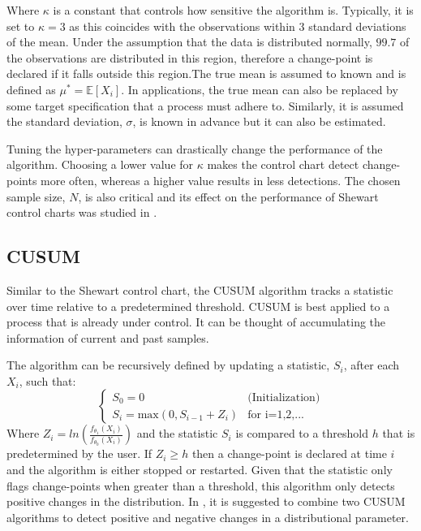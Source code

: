 Where $\kappa$ is a constant that controls how sensitive the algorithm is. Typically, it is set to $\kappa=3$ as this coincides with the observations within $3$ standard deviations of the mean.  Under the assumption that the data is distributed normally, $99.7$ of the observations are distributed in this region, therefore a change-point is declared if it falls outside this region.The true mean is assumed to known and is defined as $\mu^* = \mathbb{E}[X_i]$. In applications, the true mean can also be replaced by some target specification that a process must adhere to. Similarly, it is assumed the standard deviation, $\sigma$, is known in advance but it can also be estimated.

Tuning the hyper-parameters can drastically change the performance of the algorithm. Choosing a lower value for $\kappa$ makes the control chart detect change-points more often, whereas a higher value results in less detections. The chosen sample size, $N$, is also critical and its effect on the performance of Shewart control charts was studied in \cite{haridy2017effect}.

\subsection{CUSUM}
Similar to the Shewart control chart, the CUSUM algorithm tracks a statistic over time relative to a predetermined threshold. CUSUM is best applied to a process that is already under control. It can be thought of accumulating the information of current and past samples. 

The algorithm can be recursively defined by updating a statistic, $S_i$, after each $X_i$, such that:
\begin{equation}
  \begin{cases}
    S_0 = 0  & \text{(Initialization)} \\
    S_i = \text{max}(0, S_{i-1} + Z_i) & \text{for i=1,2,...}
  \end{cases}
\end{equation}
Where $Z_i=ln(\frac{f_{\theta_1}(X_i)}{f_{\theta_0}(X_i)})$ and the statistic $S_i$ is compared to a threshold $h$ that is predetermined by the user. If $Z_i \geq h$ then a change-point is declared at time $i$ and the algorithm is either stopped or restarted. Given that the statistic only flags change-points when greater than a threshold, this algorithm only detects positive changes in the distribution. In \cite{page1954continuous}, it is suggested to combine two CUSUM algorithms to detect positive and negative changes in a distributional parameter.

